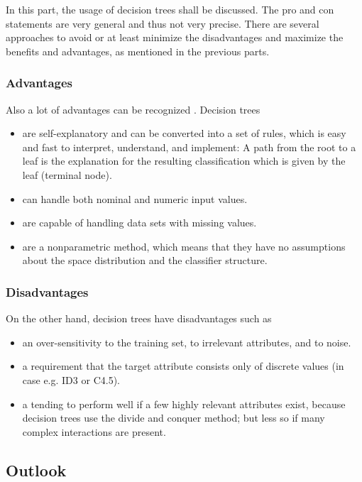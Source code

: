 In this part, the usage of decision trees shall be discussed. The pro and con statements are very general and thus not very precise. There are several approaches to avoid or at least minimize the disadvantages and maximize the benefits and advantages, as mentioned in the previous parts.


\subsubsection{Advantages}

Also a lot of advantages can be recognized \cite[p. 73ff.]{rokach2008data}. Decision trees
\begin{itemize}
    \item are self-explanatory and can be converted into a set of rules, which is easy and fast to interpret, understand, and implement: A path from the root to a leaf is the explanation for the resulting classification which is given by the leaf (terminal node). 
    \item can handle both nominal and numeric input values.
    \item are capable of handling data sets with missing values.
    \item are a nonparametric method, which means that they have no assumptions about the space distribution and the classifier structure. 
\end{itemize}


\subsubsection{Disadvantages}
On the other hand, decision trees have disadvantages such as 
\begin{itemize}
    \item an over-sensitivity to the training set, to irrelevant attributes, and to noise.
    \item a requirement that the target attribute consists only of discrete values (in case e.g. ID3 or C4.5).
    \item a tending to perform well if a few highly relevant attributes exist, because decision trees use the divide and conquer method; but less so if many complex interactions are present. 
\end{itemize}






\subsection{Outlook}

